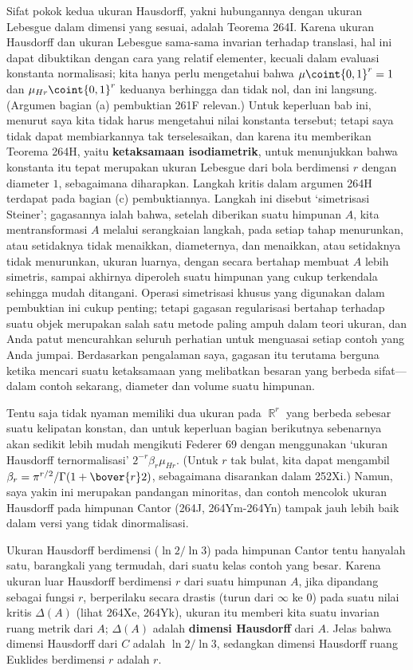 {Sifat pokok kedua ukuran Hausdorff, yakni hubungannya dengan ukuran Lebesgue
dalam dimensi yang sesuai, adalah Teorema 264I. Karena ukuran Hausdorff dan
ukuran Lebesgue sama-sama invarian terhadap translasi, hal ini dapat
dibuktikan dengan cara yang relatif elementer, kecuali dalam evaluasi
konstanta normalisasi; kita hanya perlu mengetahui bahwa
$\mu\coint{0,1}^r=1$ dan $\mu_{Hr}\coint{0,1}^r$ keduanya berhingga dan tidak
nol, dan ini langsung. (Argumen bagian (a) pembuktian 261F relevan.) Untuk
keperluan bab ini, menurut saya kita tidak harus mengetahui nilai konstanta
tersebut; tetapi saya tidak dapat membiarkannya tak terselesaikan, dan karena
itu memberikan Teorema 264H, yaitu {\bf ketaksamaan isodiametrik}, untuk
menunjukkan bahwa konstanta itu tepat merupakan ukuran Lebesgue dari bola
berdimensi $r$ dengan diameter $1$, sebagaimana diharapkan. Langkah kritis
dalam argumen 264H terdapat pada bagian (c) pembuktiannya. Langkah ini disebut
`simetrisasi Steiner'; gagasannya ialah bahwa, setelah diberikan suatu
himpunan $A$, kita mentransformasi $A$ melalui serangkaian langkah, pada
setiap tahap menurunkan, atau setidaknya tidak menaikkan, diameternya, dan
menaikkan, atau setidaknya tidak menurunkan, ukuran luarnya, dengan secara
bertahap membuat $A$ lebih simetris, sampai akhirnya diperoleh suatu himpunan
yang cukup terkendala sehingga mudah ditangani. Operasi simetrisasi khusus
yang digunakan dalam pembuktian ini cukup penting; tetapi gagasan regularisasi
bertahap terhadap suatu objek merupakan salah satu metode paling ampuh dalam
teori ukuran, dan Anda patut mencurahkan seluruh perhatian untuk menguasai
setiap contoh yang Anda jumpai. Berdasarkan pengalaman saya, gagasan itu
terutama berguna ketika mencari suatu ketaksamaan yang melibatkan besaran
yang berbeda sifat—dalam contoh sekarang, diameter dan volume suatu himpunan.

Tentu saja tidak nyaman memiliki dua ukuran pada $\BbbR^r$ yang berbeda
sebesar suatu kelipatan konstan, dan untuk keperluan bagian berikutnya
sebenarnya akan sedikit lebih mudah mengikuti {\smc Federer 69} dengan
menggunakan `ukuran Hausdorff ternormalisasi'
$2^{-r}\beta_r\mu_{Hr}$. (Untuk $r$ tak bulat, kita dapat mengambil
$\beta_r=\pi^{r/2}/\Gamma(1+\bover{r}2)$, sebagaimana disarankan dalam
252Xi.) Namun, saya yakin ini merupakan pandangan minoritas, dan contoh
mencolok ukuran Hausdorff pada himpunan Cantor (264J, 264Ym-264Yn) tampak jauh
lebih baik dalam versi yang tidak dinormalisasi.

Ukuran Hausdorff berdimensi ($\ln 2/\ln 3$) pada himpunan Cantor tentu
hanyalah satu, barangkali yang termudah, dari suatu kelas contoh yang besar.
Karena ukuran luar Hausdorff berdimensi $r$ dari suatu himpunan $A$, jika
dipandang sebagai fungsi $r$, berperilaku secara drastis (turun dari $\infty$
ke $0$) pada suatu nilai kritis $\Delta(A)$ (lihat 264Xe, 264Yk), ukuran itu
memberi kita suatu invarian ruang metrik dari $A$; $\Delta(A)$ adalah
{\bf dimensi Hausdorff} dari $A$. Jelas bahwa dimensi Hausdorff dari $C$
adalah $\ln 2/\ln 3$, sedangkan dimensi Hausdorff ruang Euklides berdimensi
$r$ adalah $r$.
}%

\discrpage
